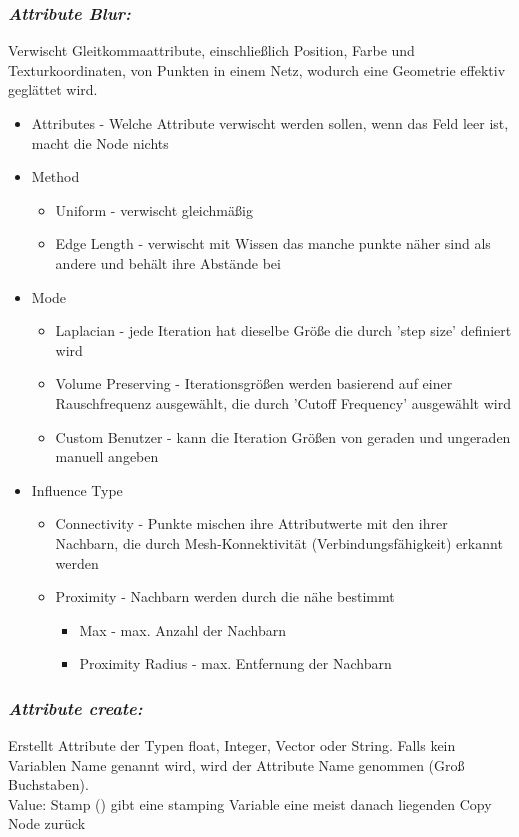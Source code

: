 \documentclass[paper=a4,fontsize=12pt,ngerman]{scrartcl}
\begin{document}
 	\subsubsection*{\textit{Attribute Blur:}}
 	Verwischt Gleitkommaattribute, einschließlich Position, Farbe und Texturkoordinaten, von Punkten in einem Netz, wodurch eine Geometrie effektiv geglättet wird.
 	\begin{itemize}
 		\item Attributes - Welche Attribute verwischt werden sollen, wenn das Feld leer ist, macht die Node nichts
 		\item Method \begin{itemize} 
 			\item Uniform - verwischt gleichmäßig
 			\item Edge Length - verwischt mit Wissen das manche punkte näher sind als andere und behält ihre Abstände bei 
 		\end{itemize}
 		\item Mode	\begin{itemize} 
 			\item Laplacian - jede Iteration hat dieselbe Größe die durch 'step size' definiert wird
 			\item Volume Preserving - Iterationsgrößen werden basierend auf einer Rauschfrequenz ausgewählt, die durch 'Cutoff Frequency' ausgewählt wird
 			\item Custom	Benutzer - kann die Iteration Größen von geraden und ungeraden manuell angeben	
 		\end{itemize}
 		\item Influence Type 
 		\begin{itemize}
 			\item Connectivity - Punkte mischen ihre Attributwerte mit den ihrer Nachbarn, die durch  Mesh-Konnektivität (Verbindungsfähigkeit) erkannt werden
 			\item Proximity - Nachbarn werden durch die nähe bestimmt 
 			\begin{itemize}
 				\item Max - max. Anzahl der Nachbarn
 				\item Proximity Radius - max. Entfernung der Nachbarn
 			\end{itemize}
 		\end{itemize}
 	\end{itemize}
 	
 	\subsubsection*{\textit{Attribute create:}}
 	Erstellt Attribute der Typen float, Integer, Vector oder String. Falls kein Variablen Name genannt wird, wird der Attribute Name genommen (Groß Buchstaben).\\
 	Value: Stamp ()	gibt eine stamping Variable eine meist danach liegenden Copy Node zurück
 	
\end{document}
